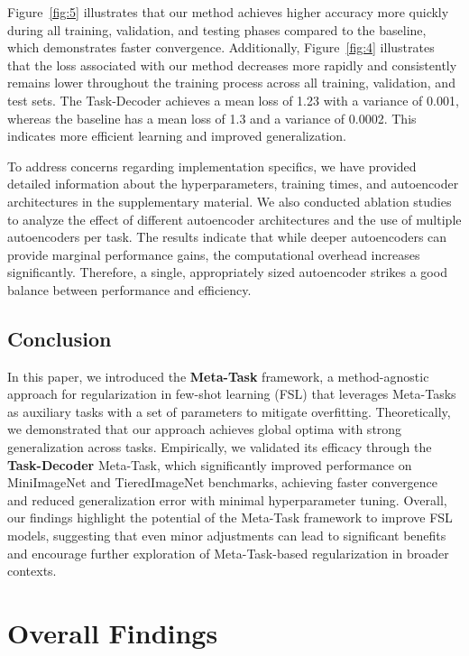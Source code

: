 Figure~\ref{fig:5} illustrates that our method achieves higher accuracy more quickly during all training, validation, and testing phases compared to the baseline, which demonstrates faster convergence. Additionally, Figure~\ref{fig:4} illustrates that the loss associated with our method decreases more rapidly and consistently remains lower throughout the training process across all training, validation, and test sets. The Task-Decoder achieves a mean loss of 1.23 with a variance of 0.001, whereas the baseline has a mean loss of 1.3 and a variance of 0.0002. This indicates more efficient learning and improved generalization.
  
To address concerns regarding implementation specifics, we have provided detailed information about the hyperparameters, training times, and autoencoder architectures in the supplementary material. We also conducted ablation studies to analyze the effect of different autoencoder architectures and the use of multiple autoencoders per task. The results indicate that while deeper autoencoders can provide marginal performance gains, the computational overhead increases significantly. Therefore, a single, appropriately sized autoencoder strikes a good balance between performance and efficiency.
  
\subsection{Conclusion}

In this paper, we introduced the {\textbf{Meta-Task}} framework, a method-agnostic approach for regularization in few-shot learning (FSL) that leverages Meta-Tasks as auxiliary tasks with a set of parameters to mitigate overfitting. Theoretically, we demonstrated that our approach achieves global optima with strong generalization across tasks. Empirically, we validated its efficacy through the {\textbf{Task-Decoder}} Meta-Task, which significantly improved performance on MiniImageNet and TieredImageNet benchmarks, achieving faster convergence and reduced generalization error with minimal hyperparameter tuning. Overall, our findings highlight the potential of the {{Meta-Task}} framework to improve FSL models, suggesting that even minor adjustments can lead to significant benefits and encourage further exploration of Meta-Task-based regularization in broader contexts.

\section{Overall Findings}

